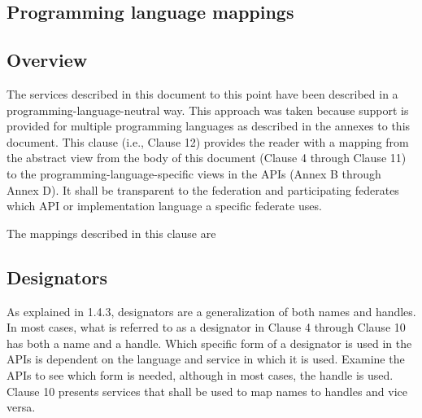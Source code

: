 

\clearpage

\begin{compactstdpage}
    \section{Programming language mappings}

    \subsection{Overview}

    The services described in this document to this point have been described in a programming-language-neutral way. This approach was taken because support is provided for multiple programming languages as described in the annexes to this document. This clause (i.e., Clause 12) provides the reader with a mapping from the abstract view from the body of this document (Clause 4 through Clause 11) to the programming-language-specific views in the APIs (Annex B through Annex D). It shall be transparent to the federation and participating federates which API or implementation language a specific federate uses.

    The mappings described in this clause are


    \subsection{Designators}

    As explained in 1.4.3, designators are a generalization of both names and handles. In most cases, what is referred to as a designator in Clause 4 through Clause 10 has both a name and a handle. Which specific form of a designator is used in the APIs is dependent on the language and service in which it is used. Examine the APIs to see which form is needed, although in most cases, the handle is used. Clause 10 presents services that shall be used to map names to handles and vice versa.


\end{compactstdpage}
